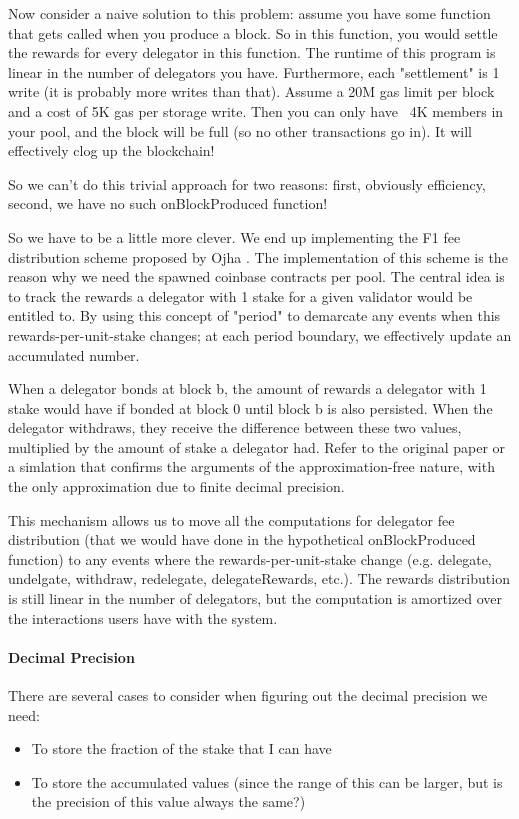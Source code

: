 Now consider a naive solution to this problem: assume you have some function that gets called when you produce a block. So in this function, you would settle the rewards for every delegator in this function. The runtime of this program is linear in the number of delegators you have. Furthermore, each "settlement" is 1 write (it is probably more writes than that). Assume a 20M gas limit per block and a cost of 5K gas per storage write. Then you can only have ~4K members in your pool, and the block will be full (so no other transactions go in). It will effectively clog up the blockchain! 

So we can't do this trivial approach for two reasons: first, obviously efficiency, second, we have no such onBlockProduced function! 

So we have to be a little more clever. We end up implementing the F1 fee distribution scheme proposed by Ojha \cite{Ojh19}. The implementation of this scheme is the reason why we need the spawned coinbase contracts per pool. The central idea is to track the rewards a delegator with 1 stake for a given validator would be entitled to. By using this concept of "period" to demarcate any events when this rewards-per-unit-stake changes; at each period boundary, we effectively update an accumulated number. 

When a delegator bonds at block b, the amount of rewards a delegator with 1 stake would have if bonded at block 0 until block b is also persisted. When the delegator withdraws, they receive the difference between these two values, multiplied by the amount of stake a delegator had. Refer to the original paper \cite{Ojh19} or a simlation \cite{Sha19} that confirms the arguments of the approximation-free nature, with the only approximation due to finite decimal precision.  

This mechanism allows us to move all the computations for delegator fee distribution (that we would have done in the hypothetical onBlockProduced function) to any events where the rewards-per-unit-stake change (e.g. delegate, undelgate, withdraw, redelegate, delegateRewards, etc.). The rewards distribution is still linear in the number of delegators, but the computation is amortized over the interactions users have with the system. 

\paragraph{Decimal Precision}

There are several cases to consider when figuring out the decimal precision we need:
\begin{itemize}[label=--,nosep]
    \item To store the fraction of the stake that I can have
    \item To store the accumulated values (since the range of this can be larger, but is the precision of this value always the same?) 
\end{itemize}

